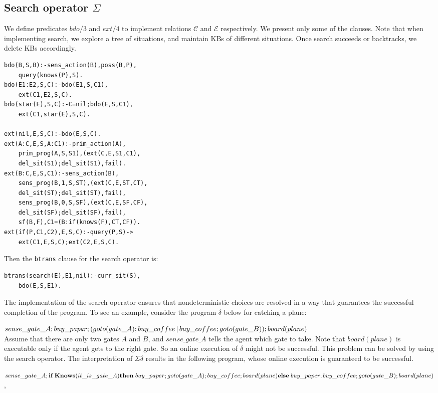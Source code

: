 \documentclass[letterpaper]{article}
\newcommand{\Knows}{\mbox{\bf Knows}}
\begin{document}
\subsection{Search operator $\Sigma$}

We define predicates $bdo/3$ and $ext/4$ to implement relations $\mathcal{C}$ and $\mathcal{E}$ respectively. We present only some of the clauses. Note that when implementing search, we explore a tree of situations, and maintain KBs of different situations. Once search succeeds or backtracks, we delete KBs accordingly.
\begin{verbatim}
bdo(B,S,B):-sens_action(B),poss(B,P),
    query(knows(P),S).
bdo(E1:E2,S,C):-bdo(E1,S,C1),
    ext(C1,E2,S,C).
bdo(star(E),S,C):-C=nil;bdo(E,S,C1),
    ext(C1,star(E),S,C).

ext(nil,E,S,C):-bdo(E,S,C).
ext(A:C,E,S,A:C1):-prim_action(A),
    prim_prog(A,S,S1),(ext(C,E,S1,C1),
    del_sit(S1);del_sit(S1),fail).
ext(B:C,E,S,C1):-sens_action(B),
    sens_prog(B,1,S,ST),(ext(C,E,ST,CT),
    del_sit(ST);del_sit(ST),fail),
    sens_prog(B,0,S,SF),(ext(C,E,SF,CF),
    del_sit(SF);del_sit(SF),fail),
    sf(B,F),C1=(B:if(knows(F),CT,CF)).
ext(if(P,C1,C2),E,S,C):-query(P,S)->
    ext(C1,E,S,C);ext(C2,E,S,C).
\end{verbatim}
Then the \texttt{btrans} clause for the search operator is:
\begin{verbatim}
btrans(search(E),E1,nil):-curr_sit(S),
    bdo(E,S,E1).
\end{verbatim}

The implementation of the search operator ensures that nondeterministic choices are resolved in a way that guarantees the successful completion of the program. To see an example, consider the program
$\delta$ below for catching a plane:

\noindent
$sense\_gate\_A;buy\_paper;\\
(goto(gate\_A);buy\_coffee \thinspace | \thinspace buy\_coffee;goto(gate\_B));\\
board(plane)$\\
Assume that there are only two gates $A$ and $B$, and $sense\_gate\_A$ tells the agent which gate to take. Note that $board(plane)$ is executable only if the agent gets to the right gate. So an online execution of $\delta$ might not be successful.
This problem can be solved by using the search operator. The interpretation of $\Sigma\delta$ results in the following program, whose online execution is guaranteed to be successful.

\noindent
$sense\_gate\_A;\\
\textbf{if}\; \Knows(it\_is\_gate\_A)\\
\textbf{then}\; buy\_paper;goto(gate\_A);buy\_coffee;board(plane)\\
\textbf{else}\; buy\_paper;buy\_coffee;goto(gate\_B);board(plane)$,\\
\end{document}
